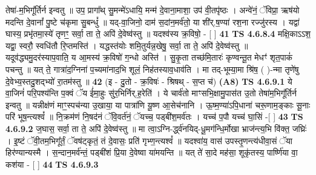 \documentclass[17pt]{extarticle}
\begin{document}
                  तेषा॑-म॒भिगू᳚र्तिर्न इन्वतु ॥ उप॒ प्रागा᳚थ् सु॒मन्मे॑ऽधायि॒ मन्म॑ दे॒वाना॒माशा॒ उप॑ वी॒तपृ॑ष्ठः । अन्वे॑नं॒ ॅविप्रा॒ ऋष॑यो मदन्ति दे॒वानां᳚ पु॒ष्टे च॑कृमा सु॒बन्धुं᳚ ॥ यद्-वा॒जिनो॒ दाम॑ स॒दांन॒मर्व॑तो॒ या शी॑र्.ष॒ण्या॑ रश॒ना रज्जु॑रस्य । यद्वा॑ घास्य॒ प्रभृ॑तमा॒स्ये॑ तृणꣳ॒॒ सर्वा॒ ता ते॒ अपि॑ दे॒वेष्व॑स्तु ॥ यदश्व॑स्य क्र॒विषो॒ - [  ] \textbf{  41} \newline
                  \newline
                                \textbf{ TS 4.6.8.4} \newline
                  मक्षि॒काऽऽश॒ यद्वा॒ स्वरौ॒ स्वधि॑तौ रि॒प्तमस्ति॑ । यद्धस्त॑योः शमि॒तुर्यन्न॒खेषु॒ सर्वा॒ ता ते॒ अपि॑ दे॒वेष्व॑स्तु ॥ यदूव॑द्ध्यमु॒दर॑स्याप॒वाति॒ य आ॒मस्य॑ क्र॒विषो॑ ग॒न्धो अस्ति॑ । सु॒कृ॒ता तच्छ॑मि॒तारः॑ कृण्वन्तू॒त मेधꣳ॑ शृत॒पाकं॑ पचन्तु ॥ यत् ते॒ गात्रा॑द॒ग्निना॑ प॒च्यमा॑नाद॒भि शूलं॒ निह॑तस्याव॒धाव॑ति । मा तद्-भूम्या॒मा श्रि॑ष॒ ( )-न्मा तृणे॑षु दे॒वेभ्य॒स्तदु॒शद्भ्यो॑ रा॒तम॑स्तु ॥ \textbf{  42 } \newline
                  \newline
                      (इ - दु॒तो - क्र॒विषः॑ - श्रिषथ् - स॒प्त च॑)  \textbf{(A8)} \newline \newline
                                        \textbf{ TS 4.6.9.1} \newline
                  ये वा॒जिनं॑ परि॒पश्य॑न्ति प॒क्वं ॅय ई॑मा॒हुः सु॑र॒भिर्निर्.ह॒रेति॑ । ये चार्व॑तो माꣳसभि॒क्षामु॒पास॑त उ॒तो तेषा॑म॒भिगू᳚र्तिर्न इन्वतु ॥ यन्नीक्ष॑णं माꣳ॒॒स्पच॑न्या उ॒खाया॒ या पात्रा॑णि यू॒ष्ण आ॒सेच॑नानि । ऊ॒ष्म॒ण्या॑ऽपि॒धाना॑ चरू॒णाम॒ङ्काः सू॒नाः परि॑ भूष॒न्त्यश्वं᳚ ॥ नि॒क्रम॑णं नि॒षद॑नं ॅवि॒वर्त॑नं॒ ॅयच्च॒ पड्बी॑श॒मर्व॑तः । यच्च॑ प॒पौ यच्च॑ घा॒सिं -[  ] \textbf{  43} \newline
                  \newline
                                \textbf{ TS 4.6.9.2} \newline
                  ज॒घास॒ सर्वा॒ ता ते॒ अपि॑ दे॒वेष्व॑स्तु ॥ मा त्वा॒ऽग्नि-र्द्ध्व॑नयिद्-धू॒मग॑न्धि॒र्मोखा भ्राज॑न्त्य॒भि वि॑क्त॒ जघ्रिः॑ । इ॒ष्टं ॅवी॒तम॒भिगू᳚र्तं॒ ॅवष॑ट्कृतं॒ तं दे॒वासः॒ प्रति॑ गृभ्ण॒न्त्यश्वं᳚ ॥ यदश्वा॑य॒ वास॑ उपस्तृ॒णन्त्य॑धीवा॒सं ॅया हिर॑ण्यान्यस्मै । स॒न्दान॒मर्व॑न्तं॒ पड्बी॑शं प्रि॒या दे॒वेष्वा या॑मयन्ति ॥ यत् ते॑ सा॒दे मह॑सा॒ शूकृ॑तस्य॒ पार्ष्णि॑या वा॒ कश॑या - [  ] \textbf{  44 } \newline
                  \newline
                                \textbf{ TS 4.6.9.3} \newline
\end{document}
